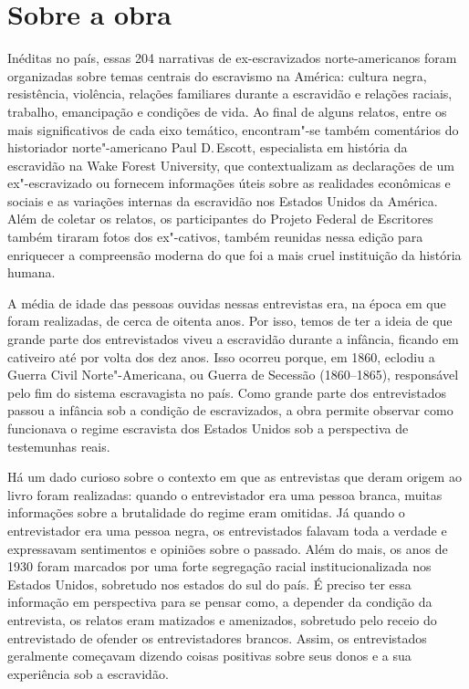 \section{Sobre a obra}

Inéditas no país, essas 204 narrativas de ex-escravizados norte-americanos foram organizadas sobre temas centrais do escravismo na América: cultura negra, resistência, violência, relações familiares durante a escravidão e relações raciais, trabalho, emancipação e condições de vida.
Ao final de alguns relatos, entre os mais significativos de cada eixo temático, encontram"-se também comentários do historiador norte"-americano Paul D.\,Escott, especialista em história da escravidão na Wake Forest University, que contextualizam as declarações de um ex"-escravizado ou fornecem informações úteis sobre as realidades econômicas e sociais e as variações internas da escravidão nos Estados Unidos da América.
Além de coletar os relatos, os participantes do Projeto Federal de Escritores também tiraram fotos dos ex"-cativos, também reunidas nessa edição para enriquecer a compreensão moderna do que foi a mais cruel instituição da história humana.

A média de idade das pessoas ouvidas nessas entrevistas era, na época em
que foram realizadas, de cerca de oitenta anos. Por isso, temos de ter a
ideia de que grande parte dos entrevistados viveu a escravidão durante a
infância, ficando em cativeiro até por volta dos dez anos. Isso ocorreu
porque, em 1860, eclodiu a Guerra Civil Norte"-Americana, ou Guerra de Secessão (1860--1865), responsável pelo fim do sistema escravagista no país.
Como grande parte dos entrevistados passou a infância sob a condição de
escravizados, a obra permite observar como funcionava o regime
escravista dos Estados Unidos sob a perspectiva de testemunhas reais.

Há um dado curioso sobre o contexto em que as entrevistas que deram
origem ao livro foram realizadas: quando o entrevistador era uma pessoa
branca, muitas informações sobre a brutalidade do regime eram omitidas.
Já quando o entrevistador era uma pessoa negra, os entrevistados falavam
toda a verdade e expressavam sentimentos e opiniões sobre o passado.
Além do mais, os anos de 1930 foram marcados por uma forte segregação
racial institucionalizada nos Estados Unidos, sobretudo nos estados do
sul do país.
É preciso ter essa informação em perspectiva para se pensar como, a depender da condição da entrevista, os relatos eram matizados e amenizados, sobretudo pelo receio do entrevistado de ofender os entrevistadores brancos. Assim, os entrevistados geralmente
começavam dizendo coisas positivas sobre seus donos e a sua experiência
sob a escravidão.


